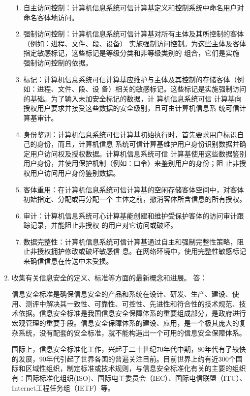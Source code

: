 \documentclass[degree=project,degree-type=project,cjk-font=noto]{thuthesis}
\begin{document}
\begin{enumerate}
\begin{enumerate}
	\item 自主访问控制：计算机信息系统可信计算基定义和控制系统中命名用户对命名客体地访问。
	\item 强制访问控制：计算机信息系统可信计算基对所有主体及其所控制的客体（例如：进程、文件、段、设备）
实施强制访问控制。为这些主体及客体指定敏感标记，这些标记是等级分类和非等级类别的
组合，它们是实施 强制访问控制的依据。
	\item 标记：计算机信息系统可信计算基应维护与主体及其控制的存储客体（例如：进程、文件、段、设
备）相关的敏感标记。这些标记是实施强制访问的基础。为了输入未加安全标记的数据，计
算机信息系统可信 计算基向授权用户要求并接受这些数据的安全级别，且可由计算机信息系
统可信计算基审计。
	\item 身份鉴别：计算机信息系统可信计算基初始执行时，首先要求用户标识自己的身份，而且，计算机信息
系统可信计算基维护用户身份识别数据并确定用户访问权及授权数据。计算机信息系统可信
计算基使用这些数据鉴别用户身份，并使用保护机制（例如：口令）来鉴别用户的身份；阻
止非授权用户访问用户身份鉴别数据。
	\item 客体重用：在计算机信息系统可信计算基的空闲存储客体空间中，对客体初始指定、分配或再分配一个
主体之前，撤消客体所含信息的所有授权。
	\item 审计：计算机信息系统可心计算基能创建和维护受保护客体的访问审计跟踪记录，并能阻止非授权
的用户对它访问或破坏。
	\item 数据完整性：计算机信息系统可信计算基通过自主和强制完整性策略，阻止非授权拥护修改或破坏敏感信
息。在网络环境中，使用完整性敏感标记来确信信息在传送中未受损。
\end{enumerate}

\item 收集有关信息安全的定义、标准等方面的最新概念和进展。
\newline
{\heiti 答：}
\newline

信息安全标准是确保信息安全的产品和系统在设计、研发、生产、建设、使用、测评中解决其一致性、可靠性、可控性、先进性和符合性的技术规范、技术依据。信息安全标准是我国信息安全保障体系的重要组成部分，是政府进行宏观管理的重要手段。信息安全保障体系的建设、应用，是一个极其庞大的复杂系统，没有配套的安全标准，就不能构造出一个可用的信息安全保障体系。

国际上，信息安全标准化工作，兴起于二十世纪70年代中期，80年代有了较快的发展，90年代引起了世界各国的普遍关注目前。目前世界上约有近300个国际和区域性组织，制定标准或技术规则，与信息安全标准化有关的主要的组织有：国际标准化组织(ISO)、国际电工委员会（IEC）、国际电信联盟（ITU）、Internet工程任务组（IETF）等。


\end{enumerate}
\end{document}
